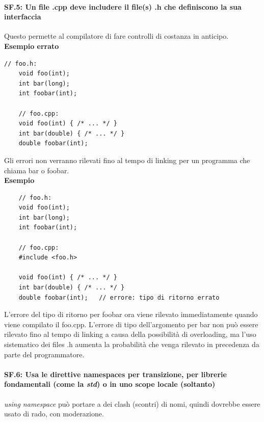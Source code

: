 \paragraph{SF.5: Un file .cpp deve includere il file(s) .h che definiscono la sua interfaccia}

\textsf{\small Questo permette al compilatore di fare controlli di costanza in anticipo.} \\

\textsf{\small \textbf{Esempio errato}}

\begin{lstlisting}[frame=single, rulecolor=\color{red}]
	// foo.h:
	void foo(int);
	int bar(long);
	int foobar(int);
	
	// foo.cpp:
	void foo(int) { /* ... */ }
	int bar(double) { /* ... */ }
	double foobar(int);
\end{lstlisting}

\textsf{\small Gli errori non verranno rilevati fino al tempo di linking per un programma che chiama bar o foobar.} \\

\textsf{\small \textbf{Esempio}}

\begin{lstlisting}
	// foo.h:
	void foo(int);
	int bar(long);
	int foobar(int);
	
	// foo.cpp:
	#include <foo.h>
	
	void foo(int) { /* ... */ }
	int bar(double) { /* ... */ }
	double foobar(int);   // errore: tipo di ritorno errato
\end{lstlisting}

\textsf{\small L'errore del tipo di ritorno per foobar ora viene rilevato immediatamente quando viene compilato il foo.cpp. L'errore di tipo dell'argomento per bar non può essere rilevato fino al tempo di linking a causa della possibilità di overloading, ma l'uso sistematico dei files .h aumenta la probabilità che venga rilevato in precedenza da parte del programmatore. } \\

\paragraph{SF.6: Usa le direttive namespaces per transizione, per librerie fondamentali (come la \emph{std}) o in uno scope locale (soltanto)}

\textsf{\small \emph{using namespace} può portare a dei clash (scontri) di nomi, quindi dovrebbe essere usato di rado, con moderazione. } \\

